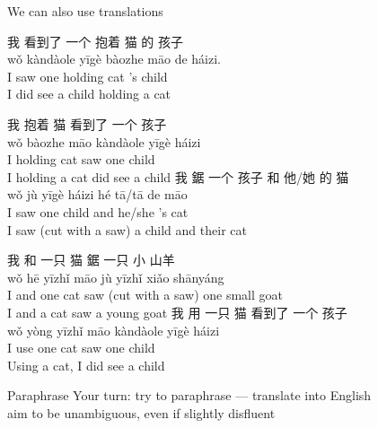 \documentclass{beamer}
\begin{document}
\begin{frame}[allowframebreaks]{We can also use translations}
\begin{exe}
  \ex \glll 我 看到了 一个 抱着 猫 的 孩子 \\
  wǒ   kàndàole    yīgè   bàozhe  māo  de    háizi. \\
  I saw one holding cat 's child \\
  \trans I did see a child holding a cat

  \ex \glll 我 抱着 猫 看到了 一个 孩子 \\
  wǒ  bàozhe māo kàndàole  yīgè     háizi \\
  I holding cat saw one  child \\
 \trans I holding a cat did see a child
  \ex \glll 我 鋸  一个 孩子 和 他/她 的 猫 \\
wǒ jù  yīgè    háizi  hé  tā/tā   de māo \\
 I      saw    one    child   and     he/she  's cat\\
 \trans I saw  (cut with a saw) a child and their cat 

  \ex \glll 我 和 一只 猫 鋸 一只 小 山羊 \\
wǒ hē  yīzhǐ  māo jù yīzhǐ xiǎo  shānyáng  \\
I and one cat saw (cut with a saw) one small goat \\

\trans I and a cat saw a young goat
  \ex \glll 我 用 一只 猫 看到了 一个 孩子 \\
wǒ yòng yīzhǐ  māo kàndàole  yīgè  háizi \\
I use one cat saw one child \\
\trans Using a cat, I did see a child
\end{exe}

\bigskip
\begin{taskb}{Paraphrase} 
  Your turn: try to paraphrase --- translate into English
  \\ aim to be unambiguous, even if slightly disfluent
\end{taskb}
\end{frame}
\end{document}
